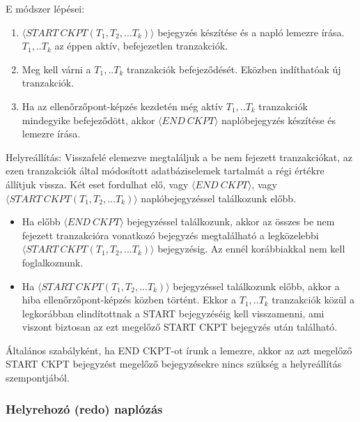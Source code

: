 \documentclass[margin=0px]{article}
\begin{document}
\noindent E módszer lépései:
\begin{enumerate}
    \item	$\langle START \ CKPT(T_{1},T_{2},...T_{k}) \rangle$ bejegyzés készítése és a napló lemezre írása. $T_{1},..T_{k}$
          az éppen aktív, befejezetlen tranzakciók.

    \item	Meg kell várni a $T_{1},..T_{k}$ tranzakciók befejeződését. Eközben indíthatóak új tranzakciók.

    \item	Ha az ellenőrzőpont-képzés kezdetén még aktív $T_{1},..T_{k}$ tranzakciók mindegyike befejeződött, akkor
          $\langle END \ CKPT \rangle$ naplóbejegyzés készítése és lemezre írása.
\end{enumerate}

\noindent Helyreállítás: Visszafelé elemezve megtaláljuk a be nem fejezett tranzakciókat, az ezen tranzakciók által
módosított adatbáziselemek tartalmát a régi értékre állítjuk vissza. Két eset fordulhat elő, vagy $\langle END \ CKPT \rangle$, vagy
$\langle START \ CKPT(T_{1},T_{2},...T_{k}) \rangle$ naplóbejegyzéssel találkozunk előbb.

\begin{itemize}
    \item	Ha előbb $\langle END \ CKPT \rangle$ bejegyzéssel találkozunk, akkor az összes be nem fejezett tranzakcióra
          vonatkozó bejegyzés megtalálható a legközelebbi $\langle START \ CKPT(T_{1},T_{2},...T_{k}) \rangle$ bejegyzésig. Az ennél
          korábbiakkal nem kell foglalkoznunk.

    \item	Ha $\langle START \ CKPT(T_{1},T_{2},...T_{k}) \rangle$ bejegyzéssel találkozunk előbb, akkor a hiba
          ellenőrzőpont-képzés közben történt. Ekkor a $T_{1},..T_{k}$ tranzakciók közül a legkorábban elindítottnak
          a START bejegyzéséig kell visszamenni, ami viszont biztosan az ezt megelőző START CKPT bejegyzés után található.
\end{itemize}

Általános szabályként, ha END CKPT-ot írunk a lemezre, akkor az azt megelőző START CKPT bejegyzést megelőző
bejegyzésekre nincs szükség a helyreállítás szempontjából.

\subsubsection{Helyrehozó (redo) naplózás}
\end{document}
